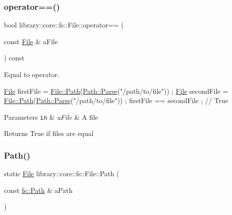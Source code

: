 \subsubsection{\texorpdfstring{operator==()}{operator==()}}
{\footnotesize\ttfamily bool library\+::core\+::fs\+::\+File\+::operator== (\begin{DoxyParamCaption}\item[{const \hyperlink{classlibrary_1_1core_1_1fs_1_1_file}{File} \&}]{a\+File }\end{DoxyParamCaption}) const}



Equal to operator. 


\begin{DoxyCode}
\hyperlink{classlibrary_1_1core_1_1fs_1_1_file_a7490060f19a21d4ee58bb6cec87a1ca6}{File} firstFile = \hyperlink{classlibrary_1_1core_1_1fs_1_1_file_a0e0d8a8becb3cdd21775554e181452d8}{File::Path}(\hyperlink{classlibrary_1_1core_1_1fs_1_1_path_aebf5bd3af83e0b7376616e146f3e55df}{Path::Parse}(\textcolor{stringliteral}{"/path/to/file"})) ;
\hyperlink{classlibrary_1_1core_1_1fs_1_1_file_a7490060f19a21d4ee58bb6cec87a1ca6}{File} secondFile = \hyperlink{classlibrary_1_1core_1_1fs_1_1_file_a0e0d8a8becb3cdd21775554e181452d8}{File::Path}(\hyperlink{classlibrary_1_1core_1_1fs_1_1_path_aebf5bd3af83e0b7376616e146f3e55df}{Path::Parse}(\textcolor{stringliteral}{"/path/to/file"})) ;
firstFile == secondFile ; \textcolor{comment}{// True}
\end{DoxyCode}



\begin{DoxyParams}[1]{Parameters}
\mbox{\tt in}  & {\em a\+File} & A file \\
\hline
\end{DoxyParams}
\begin{DoxyReturn}{Returns}
True if files are equal 
\end{DoxyReturn}
\mbox{\label{classlibrary_1_1core_1_1fs_1_1_file_a0e0d8a8becb3cdd21775554e181452d8}} 
\subsubsection{\texorpdfstring{Path()}{Path()}}
{\footnotesize\ttfamily static \hyperlink{classlibrary_1_1core_1_1fs_1_1_file}{File} library\+::core\+::fs\+::\+File\+::\+Path (\begin{DoxyParamCaption}\item[{const \hyperlink{classlibrary_1_1core_1_1fs_1_1_path}{fs\+::\+Path} \&}]{a\+Path }\end{DoxyParamCaption})\hspace{0.3cm}{\ttfamily [static]}}



